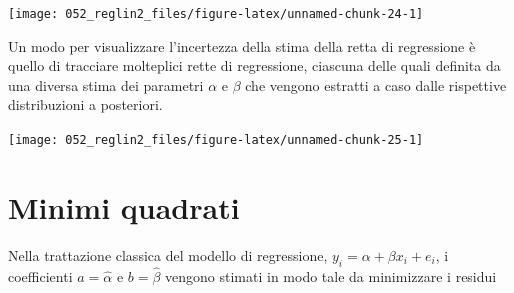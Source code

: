 \documentclass[
]{memoir}
\newenvironment{Shaded}{\begin{snugshade}}{\end{snugshade}}
\newcommand{\AttributeTok}[1]{\textcolor[rgb]{0.77,0.63,0.00}{#1}}
\newcommand{\ControlFlowTok}[1]{\textcolor[rgb]{0.13,0.29,0.53}{\textbf{#1}}}
\newcommand{\DecValTok}[1]{\textcolor[rgb]{0.00,0.00,0.81}{#1}}
\newcommand{\FunctionTok}[1]{\textcolor[rgb]{0.00,0.00,0.00}{#1}}
\newcommand{\NormalTok}[1]{#1}
\newcommand{\SpecialCharTok}[1]{\textcolor[rgb]{0.00,0.00,0.00}{#1}}
\newcommand{\StringTok}[1]{\textcolor[rgb]{0.31,0.60,0.02}{#1}}
\begin{document}
\begin{center}\texttt{[image: 052\_reglin2\_files/figure-latex/unnamed-chunk-24-1]} \end{center}

\noindent
Un modo per visualizzare l'incertezza della stima della retta di regressione è quello di tracciare molteplici rette di regressione, ciascuna delle quali definita da una diversa stima dei parametri \(\alpha\) e \(\beta\) che vengono estratti a caso dalle rispettive distribuzioni a posteriori.

\begin{Shaded}
\end{Shaded}

\begin{center}\texttt{[image: 052\_reglin2\_files/figure-latex/unnamed-chunk-25-1]} \end{center}

\hypertarget{minimi-quadrati}{%
\section{Minimi quadrati}\label{minimi-quadrati}}

Nella trattazione classica del modello di regressione, \(y_i = \alpha + \beta x_i + e_i\), i coefficienti \(a = \hat{\alpha}\) e \(b = \hat{\beta}\) vengono stimati in modo tale da minimizzare i residui
\end{document}
